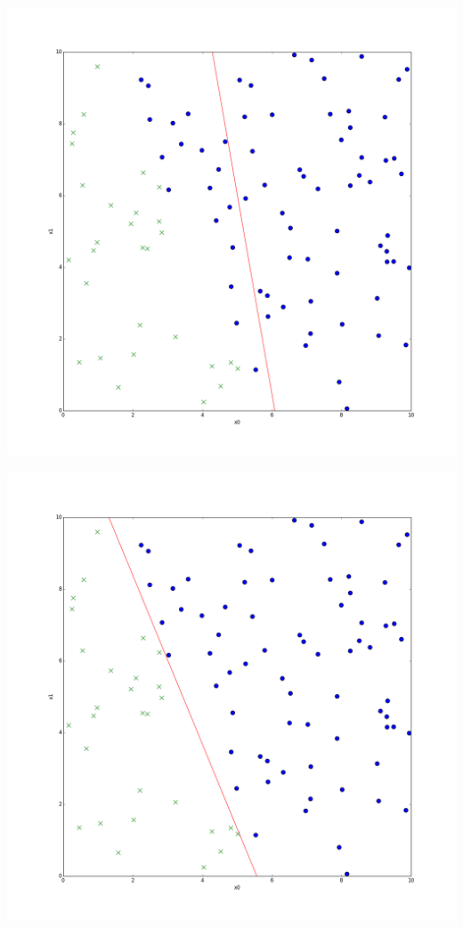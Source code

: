 \begin{frame}
  \begin{center}
    \includegraphics[scale=0.2]{./pictures/logreg_db012.png}
  \end{center}
\end{frame}

\begin{frame}
  \begin{center}
    \includegraphics[scale=0.2]{./pictures/logreg_db078.png}
  \end{center}
\end{frame}

